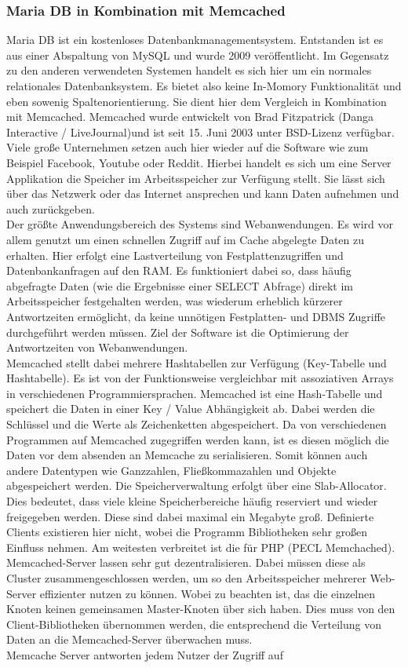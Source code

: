 \documentclass[a4paper, 12pt]{scrartcl}
\begin{document}
\subsubsection{Maria DB in Kombination mit Memcached}
Maria DB ist ein kostenloses Datenbankmanagementsystem. Entstanden ist es aus einer Abspaltung von MySQL und wurde 2009 veröffentlicht. Im Gegensatz zu den anderen verwendeten Systemen handelt es sich hier um ein normales relationales Datenbanksystem. Es bietet also keine In-Momory Funktionalität und eben sowenig Spaltenorientierung. Sie dient hier dem Vergleich in Kombination mit Memcached.  
Memcached wurde entwickelt von Brad Fitzpatrick (Danga Interactive /  LiveJournal)und ist seit 15. Juni 2003 unter BSD-Lizenz verfügbar.
Viele große Unternehmen setzen auch hier wieder auf die Software wie zum Beispiel Facebook, Youtube oder Reddit. Hierbei handelt es sich um eine Server Applikation die Speicher im Arbeitsspeicher zur Verfügung stellt. Sie lässt sich über das Netzwerk oder das Internet ansprechen und kann Daten aufnehmen und auch zurückgeben. \\ Der größte Anwendungsbereich des Systems sind Webanwendungen. Es wird vor allem genutzt um einen schnellen Zugriff auf im Cache abgelegte Daten zu erhalten. Hier erfolgt eine Lastverteilung von Festplattenzugriffen und Datenbankanfragen auf den RAM. Es funktioniert dabei so, dass häufig abgefragte Daten (wie die Ergebnisse einer SELECT Abfrage) direkt im Arbeitsspeicher festgehalten werden, was wiederum erheblich kürzerer Antwortzeiten ermöglicht, da keine unnötigen Festplatten- und DBMS Zugriffe durchgeführt werden müssen. Ziel der Software ist die Optimierung der Antwortzeiten von Webanwendungen. \\ Memcached stellt dabei mehrere Hashtabellen zur Verfügung (Key-Tabelle und Hashtabelle). Es ist von der Funktionsweise vergleichbar mit assoziativen Arrays in verschiedenen Programmiersprachen. Memcached ist eine Hash-Tabelle und speichert die Daten in einer Key / Value Abhängigkeit ab. Dabei werden die Schlüssel und die Werte als Zeichenketten abgespeichert. Da von verschiedenen Programmen auf Memcached zugegriffen werden kann, ist es diesen möglich die Daten vor dem absenden an Memcache zu serialisieren. Somit können auch andere Datentypen wie Ganzzahlen, Fließkommazahlen und Objekte abgespeichert werden. Die Speicherverwaltung erfolgt über eine Slab-Allocator. Dies bedeutet, dass viele kleine Speicherbereiche häufig reserviert und wieder freigegeben werden. Diese sind dabei maximal ein Megabyte groß. Definierte Clients existieren hier nicht, wobei die Programm Bibliotheken sehr großen Einfluss nehmen. Am weitesten verbreitet ist die für PHP (PECL Memchached). \\Memcached-Server lassen sehr gut dezentralisieren. Dabei müssen diese  als Cluster zusammengeschlossen werden, um so den Arbeitsspeicher mehrerer Web-Server effizienter nutzen zu können. Wobei zu beachten ist, das die einzelnen Knoten keinen gemeinsamen Master-Knoten über sich haben. Dies muss von den Client-Bibliotheken übernommen werden, die entsprechend die Verteilung von Daten an die Memcached-Server überwachen muss. \\ Memcache Server antworten jedem Nutzer der Zugriff auf 
\end{document}
